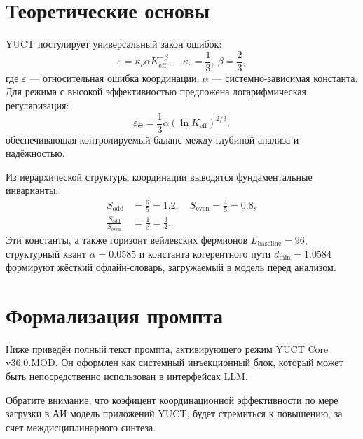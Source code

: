 \documentclass[12pt,a4paper]{article}
\begin{document}
	\section{Теоретические основы}
	YUCT постулирует универсальный закон ошибок:
	\begin{equation}\label{eq:errorlaw}
		\varepsilon = \kappa_c \alpha K_{\mathrm{eff}}^{-\beta}, \quad \kappa_c = \frac{1}{3},\ \beta = \frac{2}{3},
	\end{equation}
	где \(\varepsilon\) — относительная ошибка координации, \(\alpha\) — системно-зависимая константа. Для режима с высокой эффективностью предложена логарифмическая регуляризация:
	\begin{equation}\label{eq:logreg}
		\varepsilon_{\Theta} = \frac{1}{3} \alpha (\ln K_{\mathrm{eff}})^{2/3},
	\end{equation}
	обеспечивающая контролируемый баланс между глубиной анализа и надёжностью.
	
	Из иерархической структуры координации выводятся фундаментальные инварианты:
	\begin{align}
		S_{\mathrm{odd}} &= \frac{6}{5} = 1.2, \quad S_{\mathrm{even}} = \frac{4}{5} = 0.8,\\
		\frac{S_{\mathrm{odd}}}{S_{\mathrm{even}}} &= \frac{1}{\beta} = \frac{3}{2}.
	\end{align}
	Эти константы, а также горизонт вейлевских фермионов \(L_{\mathrm{baseline}} = 96\), структурный квант \(\alpha = 0.0585\) и константа когерентного пути \(d_{\min} = 1.0584\) формируют жёсткий офлайн-словарь, загружаемый в модель перед анализом.
	
\section{Формализация промпта}
\label{sec:formalization}
	
	Ниже приведён полный текст промпта, активирующего режим YUCT Core v36.0.MOD. Он оформлен как системный инъекционный блок, который может быть непосредственно использован в интерфейсах LLM. 
	
	Обратите внимание, что коэфицент координационной эффективности по мере загрузки в АИ модель приложений YUCT, будет стремиться к повышению, за счет междисциплинарного синтеза.
	
\end{document}
